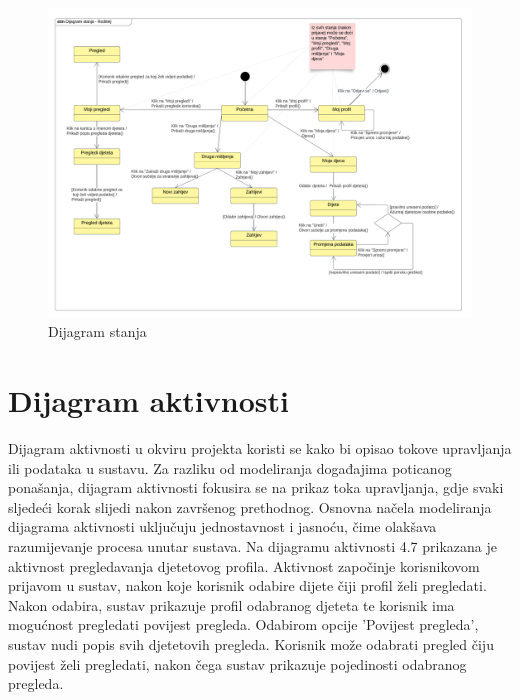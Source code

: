			\begin{figure}[H]
				\includegraphics[width=\textwidth]{slike/DijagramStanja.png} 
				\caption{Dijagram stanja} 
		    \end{figure}
						
			\eject 
		
		\section{Dijagram aktivnosti}
			
		Dijagram aktivnosti u okviru projekta koristi se kako bi opisao tokove upravljanja ili podataka u sustavu. 
		Za razliku od modeliranja događajima poticanog ponašanja, dijagram aktivnosti fokusira se na prikaz toka upravljanja, 
		gdje svaki sljedeći korak slijedi nakon završenog prethodnog. Osnovna načela modeliranja dijagrama aktivnosti uključuju 
		jednostavnost i jasnoću, čime olakšava razumijevanje procesa unutar sustava.
		Na dijagramu aktivnosti 4.7 prikazana je 
		aktivnost pregledavanja djetetovog profila. Aktivnost započinje korisnikovom prijavom u sustav, nakon koje korisnik odabire 
		dijete čiji profil želi pregledati. Nakon odabira, sustav prikazuje profil odabranog djeteta te korisnik ima mogućnost pregledati 
		povijest pregleda. Odabirom opcije 'Povijest pregleda', sustav nudi popis svih djetetovih pregleda. Korisnik može odabrati 
		pregled čiju povijest želi pregledati, nakon čega sustav prikazuje pojedinosti odabranog pregleda. 
 
